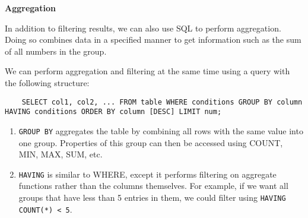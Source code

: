 \textbf{Aggregation}

In addition to filtering results, we can also use SQL to perform aggregation. Doing so combines data in a specified manner to get information such as the sum of all numbers in the group.

We can perform aggregation and filtering at the same time using a query with the following structure:
\begin{lstlisting}
    SELECT col1, col2, ... FROM table WHERE conditions GROUP BY column HAVING conditions ORDER BY column [DESC] LIMIT num;
\end{lstlisting}

\begin{enumerate}
    \item \texttt{GROUP BY} aggregates the table by combining all rows with the same value into one group. Properties of this group can then be accessed using COUNT, MIN, MAX, SUM, etc.
    \item \texttt{HAVING} is similar to WHERE, except it performs filtering on aggregate functions rather than the columns themselves. For example, if we want all groups that have less than 5 entries in them, we could filter using \texttt{HAVING COUNT(*) < 5}.
\end{enumerate}